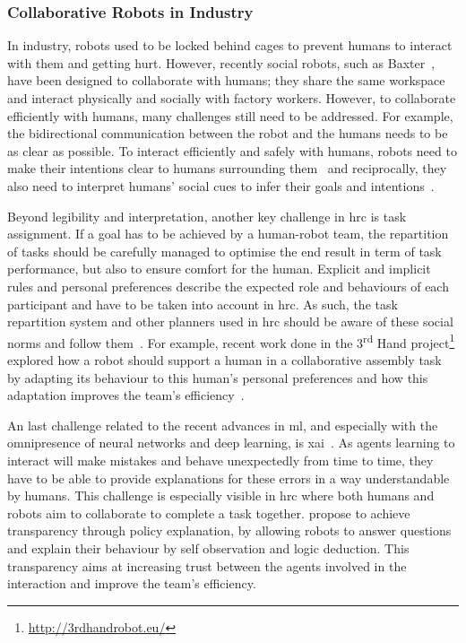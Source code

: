 \subsubsection{Collaborative Robots in Industry}
	In industry, robots used to be locked behind cages to prevent humans to interact with them and getting hurt. However, recently social robots, such as Baxter~\citep{guizzo2012rethink}, have been designed to collaborate with humans; they share the same workspace and interact physically and socially with factory workers. 
	However, to collaborate efficiently with humans, many challenges still need to be addressed. For example, the bidirectional communication between the robot and the humans needs to be as clear as possible. To interact efficiently and safely with humans, robots need to make their intentions clear to humans surrounding them~\citep{dragan2013legibility} and reciprocally, they also need to interpret humans' social cues to infer their goals and intentions~\citep{scheutz2007first}.
	
	Beyond legibility and interpretation, another key challenge in \gls{hrc} is task assignment. If a goal has to be achieved by a human-robot team, the repartition of tasks should be carefully managed to  optimise the end result in term of task performance, but also to ensure comfort for the human. Explicit and implicit rules and personal preferences describe the expected role and behaviours of each participant and have to be taken into account in \gls{hrc}. As such, the task repartition system and other planners used in \gls{hrc} should be aware of these social norms and follow them~\citep{montreuil2007planning}. For example, recent work done in the 3\textsuperscript{rd} Hand project\footnote{\url{http://3rdhandrobot.eu/}} explored how a robot should support a human in a collaborative assembly task by adapting its behaviour to this human's personal preferences and how this adaptation improves the team's efficiency~\citep{munzer2017efficient}.
	
	An last challenge related to the recent advances in \gls{ml}, and especially with the omnipresence of neural networks and deep learning, is \gls{xai}~\citep{wachter2017transparent}. As agents learning to interact will make mistakes and behave unexpectedly from time to time, they have to be able to provide explanations for these errors in a way understandable by humans. This challenge is especially visible in \gls{hrc} where both humans and robots aim to collaborate to complete a task together. \cite{hayes2017improving} propose to achieve transparency through policy explanation, by allowing robots to answer questions and explain their behaviour by self observation and logic deduction. This transparency aims at increasing trust between the agents involved in the interaction and improve the team's efficiency.
	
